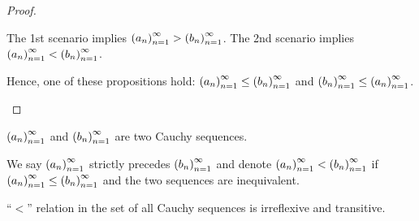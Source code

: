 \begin{proof}
\begin{itemize}
\begin{enumerate}[label={\textbf{Case \arabic*.}},itemsep=0pt,itemindent=1cm]
                        The 1st scenario implies $\seq{a_{n}} > \seq{b_{n}}$. The 2nd scenario implies $\seq{a_{n}} < \seq{b_{n}}$.
              \end{enumerate}

              Hence, one of these propositions hold: $\seq{a_{n}}\le\seq{b_{n}}$ and $\seq{b_{n}}\le\seq{a_{n}}$.
    \end{itemize}
\end{proof}

\begin{definition}
    $\seq{a_{n}}$ and $\seq{b_{n}}$ are two Cauchy sequences.

    We say $\seq{a_{n}}$ strictly precedes $\seq{b_{n}}$ and denote $\seq{a_{n}} < \seq{b_{n}}$ if $\seq{a_{n}}\le\seq{b_{n}}$ and the two sequences are inequivalent.
\end{definition}

\begin{theorem}
    ``$<$'' relation in the set of all Cauchy sequences is irreflexive and transitive.
\end{theorem}

